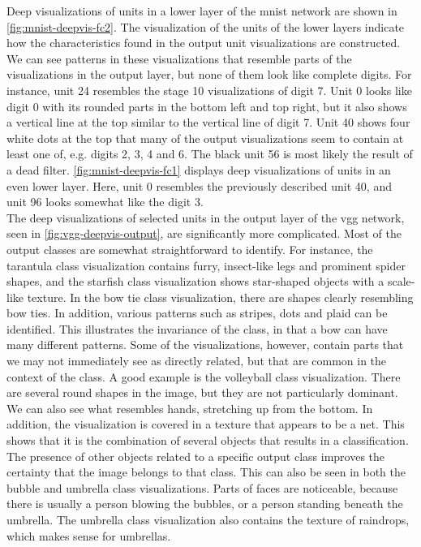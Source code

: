 \noindent Deep visualizations of units in a lower layer of the \acrshort{mnist} network are shown in \autoref{fig:mnist-deepvis-fc2}. The visualization of the units of the lower layers indicate how the characteristics found in the output unit visualizations are constructed. We can see patterns in these visualizations that resemble parts of the visualizations in the output layer, but none of them look like complete digits. For instance, unit 24 resembles the stage 10 visualizations of digit 7. Unit 0 looks like digit 0 with its rounded parts in the bottom left and top right, but it also shows a vertical line at the top similar to the vertical line of digit 7. Unit 40 shows four white dots at the top that many of the output visualizations seem to contain at least one of, e.g. digits 2, 3, 4 and 6. The black unit 56 is most likely the result of a dead filter. \autoref{fig:mnist-deepvis-fc1} displays deep visualizations of units in an even lower layer. Here, unit 0 resembles the previously described unit 40, and unit 96 looks somewhat like the digit 3. \\

\noindent The deep visualizations of selected units in the output layer of the \acrshort{vgg} network, seen in \autoref{fig:vgg-deepvis-output}, are significantly more complicated. Most of the output classes are somewhat straightforward to identify. For instance, the tarantula class visualization contains furry, insect-like legs and prominent spider shapes, and the starfish class visualization shows star-shaped objects with a scale-like texture. In the bow tie class visualization, there are shapes clearly resembling bow ties. In addition, various patterns such as stripes, dots and plaid can be identified. This illustrates the invariance of the class, in that a bow can have many different patterns. Some of the visualizations, however, contain parts that we may not immediately see as directly related, but that are common in the context of the class. A good example is the volleyball class visualization. There are several round shapes in the image, but they are not particularly dominant. We can also see what resembles hands, stretching up from the bottom. In addition, the visualization is covered in a texture that appears to be a net. This shows that it is the combination of several objects that results in a classification. The presence of other objects related to a specific output class improves the certainty that the image belongs to that class. This can also be seen in both the bubble and umbrella class visualizations. Parts of faces are noticeable, because there is usually a person blowing the bubbles, or a person standing beneath the umbrella. The umbrella class visualization also contains the texture of raindrops, which makes sense for umbrellas. \\

